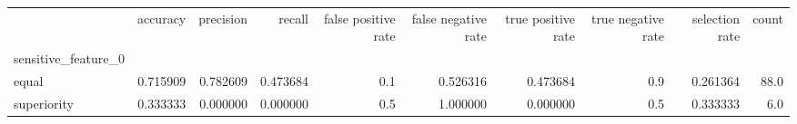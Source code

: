 \begin{tabular}{lrrrrrrrrr}
\toprule
{} &  accuracy &  precision &    recall &  false positive rate &  false negative rate &  true positive rate &  true negative rate &  selection rate &  count \\
sensitive\_feature\_0 &           &            &           &                      &                      &                     &                     &                 &        \\
\midrule
equal               &  0.715909 &   0.782609 &  0.473684 &                  0.1 &             0.526316 &            0.473684 &                 0.9 &        0.261364 &   88.0 \\
superiority         &  0.333333 &   0.000000 &  0.000000 &                  0.5 &             1.000000 &            0.000000 &                 0.5 &        0.333333 &    6.0 \\
\bottomrule
\end{tabular}
